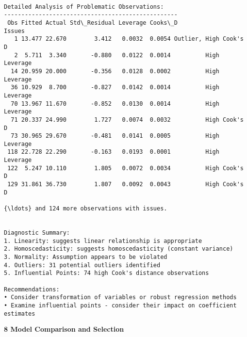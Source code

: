 \documentclass[8pt, twocolumn]{extarticle}
\begin{document}
    \begin{Verbatim}[commandchars=\\\{\}]

Detailed Analysis of Problematic Observations:
--------------------------------------------------
 Obs Fitted Actual Std\_Residual Leverage Cooks\_D                 Issues
   1 13.477 22.670        3.412   0.0032  0.0054 Outlier, High Cook's D
   2  5.711  3.340       -0.880   0.0122  0.0014          High Leverage
  14 20.959 20.000       -0.356   0.0128  0.0002          High Leverage
  36 10.929  8.700       -0.827   0.0142  0.0014          High Leverage
  70 13.967 11.670       -0.852   0.0130  0.0014          High Leverage
  71 20.337 24.990        1.727   0.0074  0.0032          High Cook's D
  73 30.965 29.670       -0.481   0.0141  0.0005          High Leverage
 118 22.728 22.290       -0.163   0.0193  0.0001          High Leverage
 122  5.247 10.110        1.805   0.0072  0.0034          High Cook's D
 129 31.861 36.730        1.807   0.0092  0.0043          High Cook's D

{\ldots} and 124 more observations with issues.


Diagnostic Summary:
1. Linearity: suggests linear relationship is appropriate
2. Homoscedasticity: suggests homoscedasticity (constant variance)
3. Normality: Assumption appears to be violated
4. Outliers: 31 potential outliers identified
5. Influential Points: 74 high Cook's distance observations

Recommendations:
• Consider transformation of variables or robust regression methods
• Examine influential points - consider their impact on coefficient estimates
    \end{Verbatim}
    \textbf{8 Model Comparison and Selection}
\end{document}
